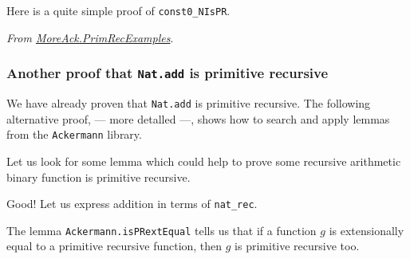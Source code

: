 \vspace{4pt}



\vspace{4pt}
Here is a quite simple proof of \texttt{const0\_NIsPR}.


\vspace{4pt}
\noindent
\emph{From \href{../theories/html/hydras.MoreAck.PrimRecExamples.html}{MoreAck.PrimRecExamples}}.



\subsubsection{Another proof that \texttt{Nat.add} is primitive recursive}

We have already proven that \texttt{Nat.add} is primitive recursive. The following alternative proof, --- more detalled  ---, 
shows how to search and apply lemmas from
the \texttt{Ackermann} library.



Let us look for some lemma which could help to prove some 
recursive arithmetic binary function is primitive recursive.


Good! Let us express addition in terms of \texttt{nat\_rec}.



The lemma \texttt{Ackermann.isPRextEqual} tells us that if a function $g$ is extensionally equal to a primitive recursive function, then $g$ is primitive recursive too.





% 


% 



